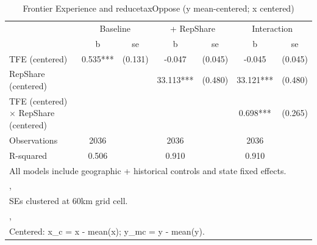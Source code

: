 \begin{table}[htbp]\centering
\def\sym#1{\ifmmode^{#1}\else\(^{#1}\)\fi}
\caption{Frontier Experience and reducetaxOppose (y mean-centered; x centered)}
\begin{tabular}{l*{3}{cc}}
\toprule
                &\multicolumn{2}{c}{Baseline}&\multicolumn{2}{c}{ + RepShare}&\multicolumn{2}{c}{Interaction}\\
                &        b   &       se&        b   &       se&        b   &       se\\
\midrule
TFE (centered)  &    0.535***&  (0.131)&   -0.047   &  (0.045)&   -0.045   &  (0.045)\\
RepShare (centered)&            &         &   33.113***&  (0.480)&   33.121***&  (0.480)\\
TFE (centered) $\times$ RepShare (centered)&            &         &            &         &    0.698***&  (0.265)\\
\midrule
Observations    &     2036   &         &     2036   &         &     2036   &         \\
R-squared       &    0.506   &         &    0.910   &         &    0.910   &         \\
\bottomrule
\multicolumn{7}{l}{\footnotesize All models include geographic + historical controls and state fixed effects.}\\
\multicolumn{7}{l}{\footnotesize ,}\\
\multicolumn{7}{l}{\footnotesize SEs clustered at 60km grid cell.}\\
\multicolumn{7}{l}{\footnotesize ,}\\
\multicolumn{7}{l}{\footnotesize Centered: x\_c = x - mean(x); y\_mc = y - mean(y).}\\
\end{tabular}
\end{table}
